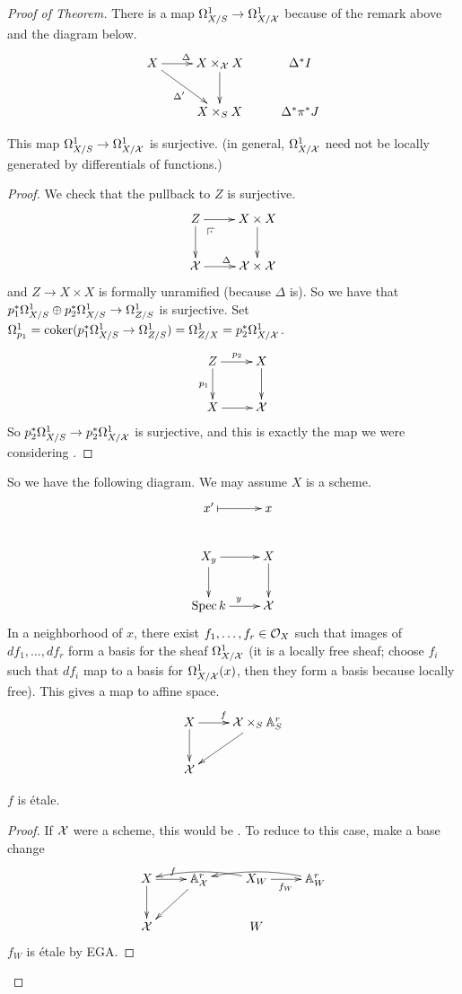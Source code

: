 \begin{proof}[Proof of Theorem]
   There is a map $\Omega^1_{X/S}\to \Omega^1_{X/\mathcal{X}}$ because of the remark above and the diagram
   below.
   \[\xymatrix{
    X\ar[r]^\Delta \ar[dr]_{\Delta'} & X\times_\X X\ar[d]& \Delta^* I\\
    & X\times_S X & \Delta^*\pi^* J
   }\]
   \begin{lemma}
     This map $\Omega^1_{X/S}\to \Omega^1_{X/\mathcal{X}}$ is surjective. (in general, $\Omega^1_{X/\mathcal{X}}$ need
     not be locally generated by differentials of functions.)
   \end{lemma}
   \begin{proof}
     We check that the pullback to $Z$ is surjective.
     \[\xymatrix{
      Z\ar[r]\ar[d]\ar@{}[dr]|(.25)\pb & X\times X\ar[d]\\
      \X\ar[r]^\Delta & \X\times \X
     }\]
     and $Z\to X\times X$ is formally unramified (because $\Delta$ is). So we have that
     $p_1^*\Omega^1_{X/S}\oplus p_2^*\Omega^1_{X/S}\to \Omega^1_{Z/S}$ is surjective. Set
     $\Omega^1_{p_1}=\operatorname{coker}(p_1^*\Omega^1_{X/S}\to \Omega^1_{Z/S})=\Omega^1_{Z/X}=p_2^*\Omega^1_{X/\mathcal{X}}$.
     \[\xymatrix{
      Z\ar[r]^{p_2}\ar[d]_{p_1} & X\ar[d]\\
      X\ar[r] & \X
     }\]
     So $p_2^*\Omega^1_{X/S}\to p_2^*\Omega^1_{X/\mathcal{X}}$ is surjective, and this is exactly the map
     we were considering .
   \renewcommand{\qedsymbol}{$\square_{\text{Lemma}}$}
   \end{proof}
   So we have the following diagram. We may assume $X$ is a scheme.
   \[\xymatrix{
    x'\ar@{|->}[r] & x\\
    X_y\ar[r]\ar[d] & X\ar[d]\\
    \spec k\ar[r]^y & \X
   }\]
    In a neighborhood of $x$, there exist $f_1,\dots, f_r\in \mathcal{O}_X$ such that images of
    $df_1,\dots, df_r$ form a basis for the sheaf $\Omega^1_{X/\mathcal{X}}$ (it is a locally free
    sheaf; choose $f_i$ such that $df_i$ map to a basis for $\Omega^1_{X/\mathcal{X}}(x)$, then they
    form a basis because locally free). This gives a map to affine space.
    \[\xymatrix{
     X\ar[r]^f\ar[d] & \X\times_S \AA^r_S\ar[dl]\\
     \X
    }\]
    \begin{lemma}
      $f$ is \'etale.
    \end{lemma}
    \begin{proof}
      If $\mathcal{X}$ were a scheme, this would be \cite[IV.17.11.1]{EGA}. To reduce to this
      case, make a base change
      \[\xymatrix{
        X\ar[r]^f \ar[d] & \AA^r_\X \ar[dl] & X_W\ar@/_/[ll]\ar[r]_{f_W} & \AA^r_W\ar@/_/[ll]\\
        \X & & W
      }\]
      $f_W$ is \'etale by EGA.
   \renewcommand{\qedsymbol}{$\square_{\text{Lemma}}$}
    \end{proof}
 \end{proof}

